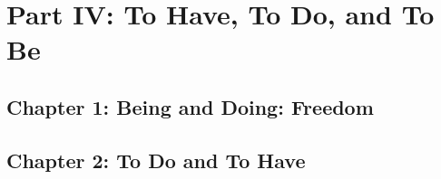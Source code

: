 \section{Part IV: To Have, To Do, and To Be}

\subsection{Chapter 1: Being and Doing: Freedom}

\subsection{Chapter 2: To Do and To Have}
